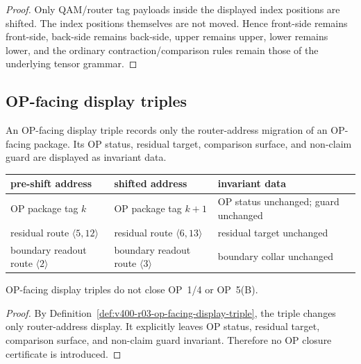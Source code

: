 \begin{proof}
Only QAM/router tag payloads inside the displayed index positions are shifted.
The index positions themselves are not moved. Hence front-side remains
front-side, back-side remains back-side, upper remains upper, lower remains
lower, and the ordinary contraction/comparison rules remain those of the
underlying tensor grammar.
\end{proof}

\subsection{OP-facing display triples}
\label{subsec:v400-r03-op-facing-display-triples}

\begin{definition}
\label{def:v400-r03-op-facing-display-triple}
An OP-facing display triple records only the router-address migration of an
OP-facing package. Its OP status, residual target, comparison surface, and
non-claim guard are displayed as invariant data.
\end{definition}

\begin{center}
\scriptsize
\setlength{\tabcolsep}{2pt}
\begin{tabular}{@{}p{}P{0.25\textwidth}P{0.35\textwidth}@{}}
\toprule
pre-shift address & shifted address & invariant data\\
\midrule
OP package tag $k$ & OP package tag $k+1$ & OP status unchanged; guard unchanged\\
residual route $\langle 5,12\rangle$ & residual route $\langle 6,13\rangle$ & residual target unchanged\\
boundary readout route $\langle 2\rangle$ & boundary readout route $\langle 3\rangle$ & boundary collar unchanged\\
\bottomrule
\end{tabular}
\end{center}

\begin{lemma}
\label{lem:v400-r03-op-facing-display-triples-do-not-close-ops}
OP-facing display triples do not close OP~1/4 or OP~5(B).
\end{lemma}

\begin{proof}
By Definition~\ref{def:v400-r03-op-facing-display-triple}, the triple changes
only router-address display. It explicitly leaves OP status, residual target,
comparison surface, and non-claim guard invariant. Therefore no OP closure
certificate is introduced.
\end{proof}

